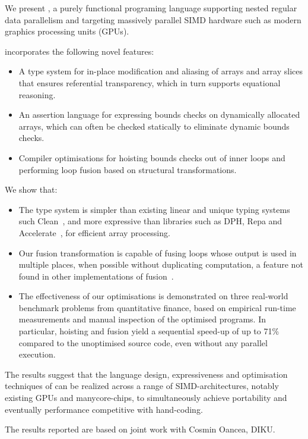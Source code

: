We present \LO{}, a purely functional programing language supporting nested
regular data parallelism and targeting massively parallel SIMD hardware
such as modern graphics processing units (GPUs).

\LO{} incorporates the following novel features:

\begin{itemize}
\item A type system for in-place modification and aliasing of arrays
  and array slices that ensures referential transparency, which in
  turn supports equational reasoning.

\item An assertion language for expressing bounds checks on
  dynamically allocated arrays, which can often be checked statically
  to eliminate dynamic bounds checks.

\item Compiler optimisations for hoisting bounds checks out of inner
  loops and performing loop fusion based on structural
  transformations.
\end{itemize}

We show that:

\begin{itemize}
\item The type system is simpler than existing linear and unique
  typing systems such Clean~\cite{barendsen1996uniqueness}, and more
  expressive than libraries such as DPH, Repa and
  Accelerate~\cite{Chak06DPH,keller2010regular,ArrayAccelerate}, for
  efficient array processing.

\item Our fusion transformation is capable of fusing loops whose
  output is used in multiple places, when possible without duplicating
  computation, a feature not found in other implementations of
  fusion~\cite{jones2001playing}.

\item The effectiveness of our optimisations is demonstrated on three
  real-world benchmark problems from quantitative finance, based on
  empirical run-time measurements and manual inspection of the
  optimised programs.  In particular, hoisting and fusion yield a
  sequential speed-up of up to 71\% compared to the unoptimised source
  code, even without any parallel execution.
\end{itemize}

The results suggest that the language design, expressiveness and
optimisation techniques of \LO{} can be realized across a range of
SIMD-architectures, notably existing GPUs and manycore-chips, to
simultaneously achieve portability and eventually performance
competitive with hand-coding.

The results reported are based on joint work with Cosmin Oancea, DIKU.

